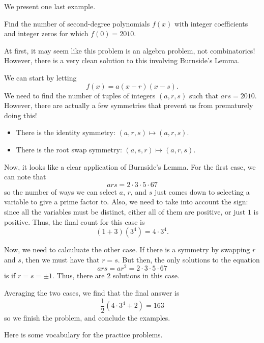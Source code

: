 \documentclass[11pt]{scrartcl}
\begin{document}
We present one last example.

\begin{example*}[2010 AIME II/10]
Find the number of second-degree polynomials $f(x)$ with integer coefficients and integer zeros for which $f(0)=2010$.
\end{example*}

At first, it may seem like this problem is an algebra problem, not combinatorics! However, there is a very clean solution to this involving Burnside's Lemma.

We can start by letting \[f(x) = a(x-r)(x-s).\] We need to find the number of tuples of integers $(a, r, s)$ such that $ars = 2010$. However, there are actually a few symmetries that prevent us from prematurely doing this!

\begin{itemize}
\item There is the identity symmetry: $(a, r, s) \mapsto (a, r, s)$.
\item There is the root swap symmetry: $(a, s, r) \mapsto (a, r, s)$.
\end{itemize}

Now, it looks like a clear application of Burnside's Lemma. For the first case, we can note that \[ars = 2\cdot 3\cdot 5\cdot 67\] so the number of ways we can select $a$, $r$, and $s$ just comes down to selecting a variable to give a prime factor to. Also, we need to take into account the sign: since all the variables must be distinct, either all of them are positive, or just $1$ is positive. Thus, the final count for this case is \[\left(1+3\right)\left(3^4\right) = 4\cdot 3^4.\]

Now, we need to calculuate the other case. If there is a symmetry by swapping $r$ and $s$, then we must have that $r = s$. But then, the only solutions to the equation \[ars = ar^2 = 2\cdot 3\cdot 5\cdot 67\] is if $r = s = \pm 1$. Thus, there are $2$ solutions in this case.

Averaging the two cases, we find that the final answer is \[\dfrac{1}{2}\left(4\cdot 3^4+2\right) = \boxed{163}\] so we finish the problem, and conclude the examples.

\newpage

Here is some vocabulary for the practice problems.
\end{document}
